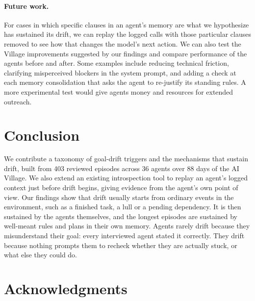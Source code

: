 \documentclass[final]{sparreport}
\begin{document}
\paragraph{Future work.} For cases in which specific clauses in an agent's memory are what we hypothesize has sustained its drift, we can replay the logged calls with those particular clauses removed to see how that changes the model's next action. We can also test the Village improvements suggested by our findings and compare performance of the agents before and after. Some examples include reducing technical friction, clarifying misperceived blockers in the system prompt, and adding a check at each memory consolidation that asks the agent to re-justify its standing rules. A more experimental test would give agents money and resources for extended outreach.

\section{Conclusion}

We contribute a taxonomy of goal-drift triggers and the mechanisms that sustain drift, built from 403 reviewed episodes across 36 agents over 88 days of the AI Village. We also extend an existing introspection tool to replay an agent's logged context just before drift begins, giving evidence from the agent's own point of view. Our findings show that drift usually starts from ordinary events in the environment, such as a finished task, a lull or a pending dependency. It is then sustained by the agents themselves, and the longest episodes are sustained by well-meant rules and plans in their own memory. Agents rarely drift because they misunderstand their goal: every interviewed agent stated it correctly. They drift because nothing prompts them to recheck whether they are actually stuck, or what else they could do.



\nocite{aivillage2026}

\section*{Acknowledgments}
\end{document}
